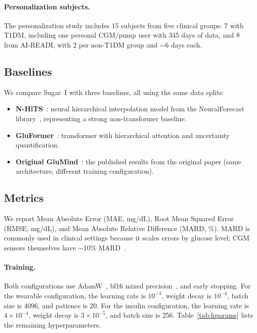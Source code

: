 \documentclass[11pt,a4paper]{article}
\begin{document}
\paragraph{Personalization subjects.}
The personalization study includes 15 subjects from five clinical groups: 7 with T1DM, including one personal CGM/pump user with 345 days of data, and 8 from AI-READI, with 2 per non-T1DM group and $\sim$6 days each.

\subsection{Baselines}

We compare Sugar~I with three baselines, all using the same data splits:
\begin{itemize}
    \item \textbf{N-HiTS}~\citep{challu2023nhits}: neural hierarchical interpolation model from the NeuralForecast library~\citep{neuralforecast2022}, representing a strong non-transformer baseline.
    \item \textbf{GluFormer}~\citep{sergazinov2022gluformer}: transformer with hierarchical attention and uncertainty quantification.
    \item \textbf{Original GluMind}~\citep{farahmand2025glumind}: the published results from the original paper (same architecture, different training configuration).
\end{itemize}

\subsection{Metrics}

We report Mean Absolute Error (MAE, mg/dL), Root Mean Squared Error (RMSE, mg/dL), and Mean Absolute Relative Difference (MARD, \%).
MARD is commonly used in clinical settings because it scales errors by glucose level; CGM sensors themselves have $\sim$10\% MARD~\citep{rodbard2016cgm}.

\paragraph{Training.}
Both configurations use AdamW~\citep{loshchilov2019adamw}, bf16 mixed precision~\citep{micikevicius2018mixed}, and early stopping.
For the wearable configuration, the learning rate is $10^{-3}$, weight decay is $10^{-4}$, batch size is 4096, and patience is 20.
For the insulin configuration, the learning rate is $4\times10^{-4}$, weight decay is $3\times10^{-5}$, and batch size is 256.
Table~\ref{tab:hparams} lists the remaining hyperparameters.
\end{document}
